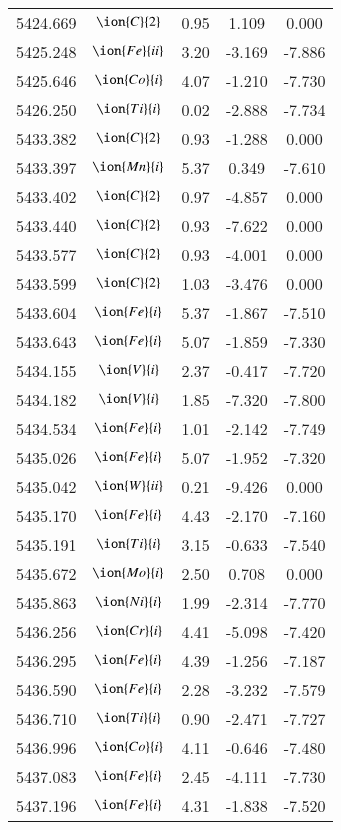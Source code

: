 \documentclass[fleqn,usenatbib]{mnras}
\begin{document}
\begin{center}
\begin{table}
\begin{tabular}{ccccc}
5424.669 &  $\ion{C}{2}$ & 0.95 & 1.109 & 0.000 \\ 
5425.248 &  $\ion{Fe}{ii}$  & 3.20 & -3.169 & -7.886 \\ 
5425.646 &  $\ion{Co}{i}$  & 4.07 & -1.210 & -7.730 \\ 
5426.250 &  $\ion{Ti}{i}$  & 0.02 & -2.888 & -7.734 \\ 
5433.382 &  $\ion{C}{2}$ & 0.93 & -1.288 & 0.000 \\ 
5433.397 &  $\ion{Mn}{i}$  & 5.37 & 0.349 & -7.610 \\ 
5433.402 &  $\ion{C}{2}$ & 0.97 & -4.857 & 0.000 \\ 
5433.440 &  $\ion{C}{2}$ & 0.93 & -7.622 & 0.000 \\ 
5433.577 &  $\ion{C}{2}$ & 0.93 & -4.001 & 0.000 \\ 
5433.599 &  $\ion{C}{2}$ & 1.03 & -3.476 & 0.000 \\ 
5433.604 &  $\ion{Fe}{i}$  & 5.37 & -1.867 & -7.510 \\ 
5433.643 &  $\ion{Fe}{i}$  & 5.07 & -1.859 & -7.330 \\ 
5434.155 &  $\ion{V}{i}$  & 2.37 & -0.417 & -7.720 \\ 
5434.182 &  $\ion{V}{i}$  & 1.85 & -7.320 & -7.800 \\ 
5434.534 &  $\ion{Fe}{i}$  & 1.01 & -2.142 & -7.749 \\ 
5435.026 &  $\ion{Fe}{i}$  & 5.07 & -1.952 & -7.320 \\ 
5435.042 &  $\ion{W}{ii}$  & 0.21 & -9.426 & 0.000 \\ 
5435.170 &  $\ion{Fe}{i}$  & 4.43 & -2.170 & -7.160 \\ 
5435.191 &  $\ion{Ti}{i}$  & 3.15 & -0.633 & -7.540 \\ 
5435.672 &  $\ion{Mo}{i}$  & 2.50 & 0.708 & 0.000 \\ 
5435.863 &  $\ion{Ni}{i}$  & 1.99 & -2.314 & -7.770 \\ 
5436.256 &  $\ion{Cr}{i}$  & 4.41 & -5.098 & -7.420 \\ 
5436.295 &  $\ion{Fe}{i}$  & 4.39 & -1.256 & -7.187 \\ 
5436.590 &  $\ion{Fe}{i}$  & 2.28 & -3.232 & -7.579 \\ 
5436.710 &  $\ion{Ti}{i}$  & 0.90 & -2.471 & -7.727 \\ 
5436.996 &  $\ion{Co}{i}$  & 4.11 & -0.646 & -7.480 \\ 
5437.083 &  $\ion{Fe}{i}$  & 2.45 & -4.111 & -7.730 \\ 
5437.196 &  $\ion{Fe}{i}$  & 4.31 & -1.838 & -7.520 \\ 

\end{tabular}
\end{table}
\end{center}
\end{document}
